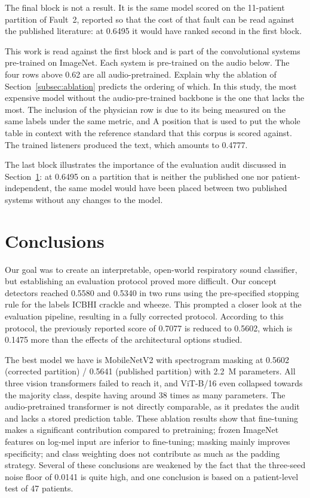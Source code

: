 \documentclass[journal,onecolumn]{IEEEtran}
\begin{document}
\begin{table}[hbtp]
\vspace{2pt}
\footnotesize The final block is not a result. It is the same model scored on the 11-patient
partition of Fault~2, reported so that the cost of that fault can be read against the published
literature: at 0.6495 it would have ranked second in the first block.
\end{table}

This work is read against the first block and is part of the convolutional systems pre-trained on ImageNet.
Each system is pre-trained on the audio below. The four rows above 0.62 are all audio-pretrained.
Explain why the ablation of Section~\ref{subsec:ablation} predicts the ordering of which.
In this study, the most expensive model without the audio-pre-trained backbone is the one that lacks the most. 
The inclusion of the physician row is due to its being measured on the same labels under the same metric, and
A position that is used to put the whole table in context with the reference standard that this corpus is scored against.
The trained listeners produced the text, which amounts to 0.4777.

The last block illustrates the importance of the evaluation audit discussed in
Section~\ref{sec:conclusion}: at 0.6495 on a partition that is neither the published one
nor patient-independent, the same model would have been placed between two published
systems without any changes to the model.

\section{Conclusions}
\label{sec:conclusion}Our goal was to create an interpretable, open-world respiratory sound classifier, but establishing an evaluation protocol proved more difficult. Our concept detectors reached 0.5580 and 0.5340 in two runs using the pre-specified stopping rule for the labels ICBHI crackle and wheeze. This prompted a closer look at the evaluation pipeline, resulting in a fully corrected protocol. According to this protocol, the previously reported score of 0.7077 is reduced to 0.5602, which is 0.1475 more than the effects of the architectural options studied.

The best model we have is MobileNetV2 with spectrogram masking at 0.5602 (corrected partition) / 0.5641 (published partition) with 2.2~M parameters. All three vision transformers failed to reach it, and ViT-B/16 even collapsed towards the majority class, despite having around 38 times as many parameters. The audio-pretrained transformer is not directly comparable, as it predates the audit and lacks a stored prediction table. These ablation results show that fine-tuning makes a significant contribution compared to pretraining; frozen ImageNet features on log-mel input are inferior to fine-tuning; masking mainly improves specificity; and class weighting does not contribute as much as the padding strategy. Several of these conclusions are weakened by the fact that the three-seed noise floor of 0.0141 is quite high, and one conclusion is based on a patient-level test of 47 patients.
\end{document}
